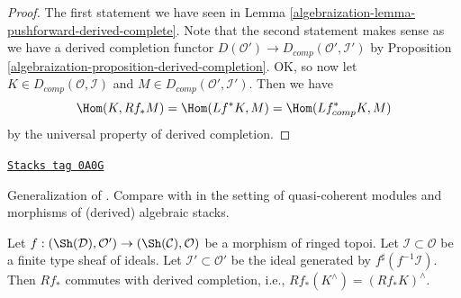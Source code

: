 \begin{proof}

The first statement we have seen in
Lemma \ref{algebraization-lemma-pushforward-derived-complete}.
Note that the second statement makes sense as we have a derived
completion functor $D(\mathcal{O}') \to D_{comp}(\mathcal{O}', \mathcal{I}')$
by Proposition \ref{algebraization-proposition-derived-completion}.
OK, so now let $K \in D_{comp}(\mathcal{O}, \mathcal{I})$
and $M \in D_{comp}(\mathcal{O}', \mathcal{I}')$. Then we have
$$
\Hom(K, Rf_*M) = \Hom(Lf^*K, M) = \Hom(Lf_{comp}^*K, M)
$$
by the universal property of derived completion.
\end{proof}

\begin{lemma}
\label{algebraization-lemma-pushforward-commutes-with-derived-completion}
\href{https://stacks.math.columbia.edu/tag/0A0G}{\texttt{Stacks tag 0A0G}}

\begin{reference}
Generalization of \cite[Lemma 6.5.9 (2)]{BS}. Compare with
\cite[Theorem 6.5]{HL-P} in the setting of quasi-coherent modules
and morphisms of (derived) algebraic stacks.
\end{reference}
Let $f : (\Sh(\mathcal{D}), \mathcal{O}') \to (\Sh(\mathcal{C}), \mathcal{O})$
be a morphism of ringed topoi. Let $\mathcal{I} \subset \mathcal{O}$
be a finite type sheaf of ideals. Let $\mathcal{I}' \subset \mathcal{O}'$
be the ideal generated by $f^\sharp(f^{-1}\mathcal{I})$.
Then $Rf_*$ commutes with derived completion, i.e.,
$Rf_*(K^\wedge) = (Rf_*K)^\wedge$.
\end{lemma}

